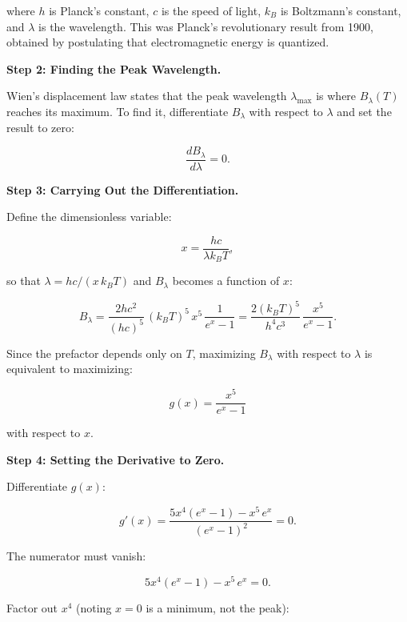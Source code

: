 where $h$ is Planck's constant, $c$ is the speed of light, $k_B$ is Boltzmann's constant, and $\lambda$ is the wavelength. This was Planck's revolutionary result from 1900, obtained by postulating that electromagnetic energy is quantized.

\textbf{Step 2: Finding the Peak Wavelength.}

Wien's displacement law states that the peak wavelength $\lambda_{\max}$ is where $B_\lambda(T)$ reaches its maximum. To find it, differentiate $B_\lambda$ with respect to $\lambda$ and set the result to zero:

\begin{equation}
\frac{dB_\lambda}{d\lambda} = 0.
\end{equation}

\textbf{Step 3: Carrying Out the Differentiation.}

Define the dimensionless variable:

\begin{equation}
x = \frac{hc}{\lambda k_B T},
\end{equation}

so that $\lambda = hc/(x\,k_B T)$ and $B_\lambda$ becomes a function of $x$:

\begin{equation}
B_\lambda = \frac{2hc^2}{(hc)^5}\,(k_B T)^5\,x^5\,\frac{1}{e^x - 1} = \frac{2(k_B T)^5}{h^4 c^3}\,\frac{x^5}{e^x - 1}.
\end{equation}

Since the prefactor depends only on $T$, maximizing $B_\lambda$ with respect to $\lambda$ is equivalent to maximizing:

\begin{equation}
g(x) = \frac{x^5}{e^x - 1}
\end{equation}

with respect to $x$.

\textbf{Step 4: Setting the Derivative to Zero.}

Differentiate $g(x)$:

\begin{equation}
g'(x) = \frac{5x^4(e^x - 1) - x^5\,e^x}{(e^x - 1)^2} = 0.
\end{equation}

The numerator must vanish:

\begin{equation}
5x^4(e^x - 1) - x^5\,e^x = 0.
\end{equation}

Factor out $x^4$ (noting $x = 0$ is a minimum, not the peak):

